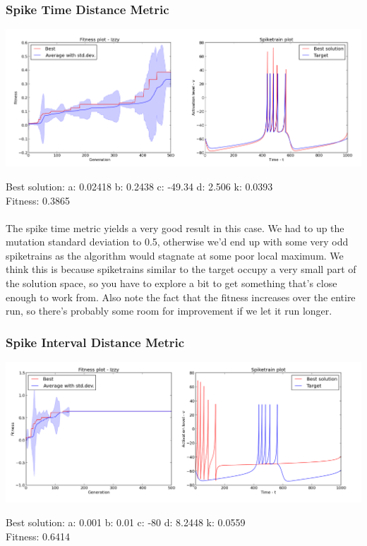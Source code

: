 \documentclass[a4paper,12pt]{article}
\begin{document}
\subsubsection{Spike Time Distance Metric}
\centerline{\includegraphics[width=1.2\textwidth]{img/case1_time}}
Best solution: 
a: 0.02418 
b: 0.2438 
c: -49.34 
d: 2.506 
k: 0.0393 \\
Fitness: 0.3865
\paragraph{}The spike time metric yields a very good result in this case. We had to up the mutation standard deviation to 0.5, otherwise we'd end up with some very odd spiketrains as the algorithm would stagnate at some poor local maximum. We think this is because spiketrains similar to the target occupy a very small part of the solution space, so you have to explore a bit to get something that's close enough to work from. Also note the fact that the fitness increases over the entire run, so there's probably some room for improvement if we let it run longer.

\subsubsection{Spike Interval Distance Metric}
\centerline{\includegraphics[width=1.2\textwidth]{img/case1_int}}
Best solution: 
a: 0.001 
b: 0.01 
c: -80 
d: 8.2448 
k: 0.0559 \\
Fitness: 0.6414
\end{document}
